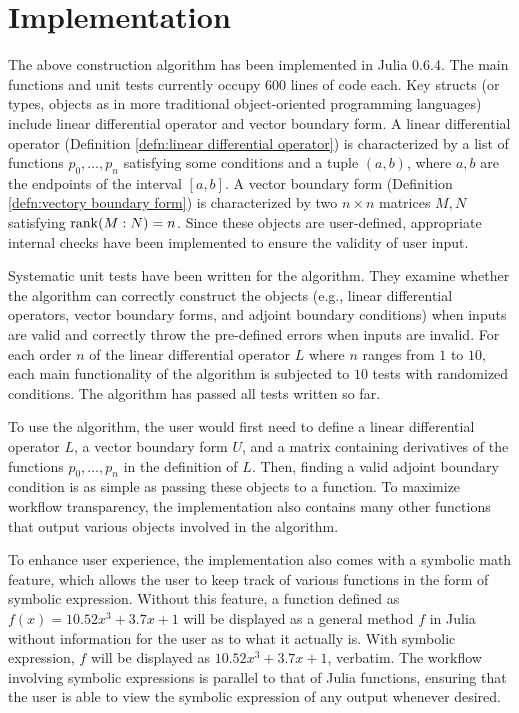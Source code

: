 \documentclass[11pt, oneside, a4paper]{article}
\begin{document}
\section{Implementation}
The above construction algorithm has been implemented in Julia 0.6.4. The main functions and unit tests currently occupy $600$ lines of code each. Key structs (or types, objects as in more traditional object-oriented programming languages) include linear differential operator and vector boundary form. A linear differential operator (Definition \ref{defn:linear differential operator}) is characterized by a list of functions $p_0,\ldots, p_n$ satisfying some conditions and a tuple $(a,b)$, where $a, b$ are the endpoints of the interval $[a,b]$. A vector boundary form (Definition \ref{defn:vectory boundary form}) is characterized by two $n\times n$ matrices $M, N$ satisfying $\operatorname{rank}(M:N)=n$. Since these objects are user-defined, appropriate internal checks have been implemented to ensure the validity of user input.

Systematic unit tests have been written for the algorithm. They examine whether the algorithm can correctly construct the objects (e.g., linear differential operators, vector boundary forms, and adjoint boundary conditions) when inputs are valid and correctly throw the pre-defined errors when inputs are invalid. For each order $n$ of the linear differential operator $L$ where $n$ ranges from $1$ to $10$, each main functionality of the algorithm is subjected to $10$ tests with randomized conditions. The algorithm has passed all tests written so far.

To use the algorithm, the user would first need to define a linear differential operator $L$, a vector boundary form $U$, and a matrix containing derivatives of the functions $p_0,\ldots, p_n$ in the definition of $L$. Then, finding a valid adjoint boundary condition is as simple as passing these objects to a function. To maximize workflow transparency, the implementation also contains many other functions that output various objects involved in the algorithm.

To enhance user experience, the implementation also comes with a symbolic math feature, which allows the user to keep track of various functions in the form of symbolic expression. Without this feature, a function defined as $f(x)=10.52x^3 + 3.7x + 1$ will be displayed as a general method $f$ in Julia without information for the user as to what it actually is. With symbolic expression, $f$ will be displayed as $10.52x^3 + 3.7x + 1$, verbatim. The workflow involving symbolic expressions is parallel to that of Julia functions, ensuring that the user is able to view the symbolic expression of any output whenever desired.
\end{document}

